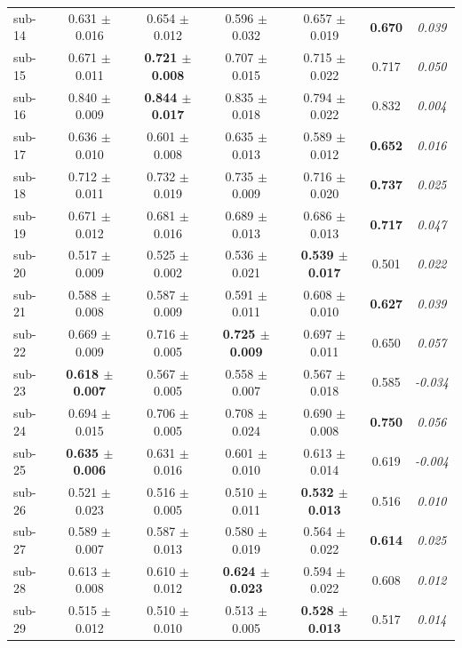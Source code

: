 \begin{table}[t]
\begin{tabular}{lcccccc}
sub-14 & 0.631 $\pm$ 0.016 & 0.654 $\pm$ 0.012 & 0.596 $\pm$ 0.032 & 0.657 $\pm$ 0.019 & \textbf{0.670} & \textit{0.039} \\
sub-15 & 0.671 $\pm$ 0.011 & \textbf{0.721 $\pm$ 0.008} & 0.707 $\pm$ 0.015 & 0.715 $\pm$ 0.022 & 0.717 & \textit{0.050} \\
sub-16 & 0.840 $\pm$ 0.009 & \textbf{0.844 $\pm$ 0.017} & 0.835 $\pm$ 0.018 & 0.794 $\pm$ 0.022 & 0.832 & \textit{0.004} \\
sub-17 & 0.636 $\pm$ 0.010 & 0.601 $\pm$ 0.008 & 0.635 $\pm$ 0.013 & 0.589 $\pm$ 0.012 & \textbf{0.652} & \textit{0.016} \\
sub-18 & 0.712 $\pm$ 0.011 & 0.732 $\pm$ 0.019 & 0.735 $\pm$ 0.009 & 0.716 $\pm$ 0.020 & \textbf{0.737} & \textit{0.025} \\
sub-19 & 0.671 $\pm$ 0.012 & 0.681 $\pm$ 0.016 & 0.689 $\pm$ 0.013 & 0.686 $\pm$ 0.013 & \textbf{0.717} & \textit{0.047} \\
sub-20 & 0.517 $\pm$ 0.009 & 0.525 $\pm$ 0.002 & 0.536 $\pm$ 0.021 & \textbf{0.539 $\pm$ 0.017} & 0.501 & \textit{0.022} \\
sub-21 & 0.588 $\pm$ 0.008 & 0.587 $\pm$ 0.009 & 0.591 $\pm$ 0.011 & 0.608 $\pm$ 0.010 & \textbf{0.627} & \textit{0.039} \\
sub-22 & 0.669 $\pm$ 0.009 & 0.716 $\pm$ 0.005 & \textbf{0.725 $\pm$ 0.009} & 0.697 $\pm$ 0.011 & 0.650 & \textit{0.057} \\
sub-23 & \textbf{0.618 $\pm$ 0.007} & 0.567 $\pm$ 0.005 & 0.558 $\pm$ 0.007 & 0.567 $\pm$ 0.018 & 0.585 & \textit{-0.034} \\
sub-24 & 0.694 $\pm$ 0.015 & 0.706 $\pm$ 0.005 & 0.708 $\pm$ 0.024 & 0.690 $\pm$ 0.008 & \textbf{0.750} & \textit{0.056} \\
sub-25 & \textbf{0.635 $\pm$ 0.006} & 0.631 $\pm$ 0.016 & 0.601 $\pm$ 0.010 & 0.613 $\pm$ 0.014 & 0.619 & \textit{-0.004} \\
sub-26 & 0.521 $\pm$ 0.023 & 0.516 $\pm$ 0.005 & 0.510 $\pm$ 0.011 & \textbf{0.532 $\pm$ 0.013} & 0.516 & \textit{0.010} \\
sub-27 & 0.589 $\pm$ 0.007 & 0.587 $\pm$ 0.013 & 0.580 $\pm$ 0.019 & 0.564 $\pm$ 0.022 & \textbf{0.614} & \textit{0.025} \\
sub-28 & 0.613 $\pm$ 0.008 & 0.610 $\pm$ 0.012 & \textbf{0.624 $\pm$ 0.023} & 0.594 $\pm$ 0.022 & 0.608 & \textit{0.012} \\
sub-29 & 0.515 $\pm$ 0.012 & 0.510 $\pm$ 0.010 & 0.513 $\pm$ 0.005 & \textbf{0.528 $\pm$ 0.013} & 0.517 & \textit{0.014} \\

\end{tabular}
\end{table}
